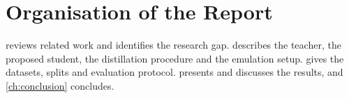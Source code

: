 \section{Organisation of the Report}

 reviews related work and identifies the research gap.  describes the teacher, the proposed student, the distillation procedure and the emulation setup.  gives the datasets, splits and evaluation protocol.  presents and discusses the results, and \cref{ch:conclusion} concludes.
